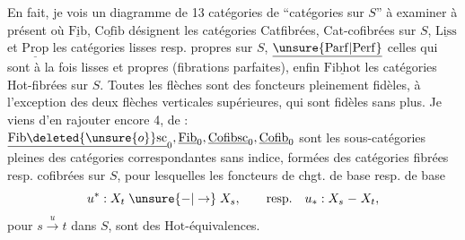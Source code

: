 En fait, je vois un diagramme de
13 catégories de ``catégories sur $S$''\unsure{,} à examiner
à présent
où $\underline{\mathrm{Fib}}$, $\underline{\mathrm{Cofib}}$ désignent les catégories Catfibrées,
Cat-cofibrées sur $S$, $\underline{\mathrm{Liss}}$  et $\underline{\mathrm{Prop}}$ les catégories
lisses resp. propres sur $S$, $\underline{\unsure{\mathrm{Parf}|\mathrm{Perf}}}$ celles qui sont à la
fois lisses et propres (fibrations parfaites),
enfin $\underline{\mathrm{Fibhot}}$ les catégories Hot-fibrées sur $S$.
Toutes les flèches sont des foncteurs  pleinement fidèles, à l'exception des deux  flèches
verticales supérieures, qui sont fidèles sans plus.
Je viens d'en rajouter encore 4, de  :
$\underline{\mathrm{Fib}\deleted{\unsure{o}}\mathrm{sc}}_0,\underline{\mathrm{Fib}}_0,\underline{\mathrm{Cofibsc}}_0,\underline{\mathrm{Cofib}}_0$ sont les sous-catégories
pleines des catégories correspondantes sans indice,
formées des catégories fibrées resp. cofibrées  sur
$S$, pour lesquelles les foncteurs de chgt. de base
resp.  de base
\[
u^*:X_t\mathrel{\unsure{-|\to}}X_s,\qquad\text{resp.}\quad u_*:X_s\mathrel{-} X_t,
\]
pour $s\xrightarrow{u}t$ dans $S$, sont des $\mathrm{Hot}$-équivalences.
